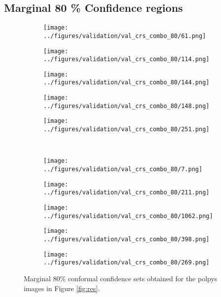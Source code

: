 \subsection{Marginal 80 \% Confidence regions}
\begin{figure}[h!]
	\begin{subfigure}{0.19\textwidth}
		\centering
		\texttt{[image: ../figures/validation/val\_crs\_combo\_80/61.png]}
		\label{fig:1}
	\end{subfigure}
	\begin{subfigure}{0.19\textwidth}
		\centering
		\texttt{[image: ../figures/validation/val\_crs\_combo\_80/114.png]}
		\label{fig:1}
	\end{subfigure}
	\begin{subfigure}{0.19\textwidth}
		\centering
		\texttt{[image: ../figures/validation/val\_crs\_combo\_80/144.png]}
		\label{fig:1}
	\end{subfigure}
	\begin{subfigure}{0.19\textwidth}
		\centering
		\texttt{[image: ../figures/validation/val\_crs\_combo\_80/148.png]}
		\label{fig:1}
	\end{subfigure}
	\begin{subfigure}{0.19\textwidth}
		\centering
		\texttt{[image: ../figures/validation/val\_crs\_combo\_80/251.png]}
		\label{fig:1}
	\end{subfigure}
	\vspace{-0.35cm}
	\\
	\begin{subfigure}{0.19\textwidth}
		\centering
		\texttt{[image: ../figures/validation/val\_crs\_combo\_80/7.png]}
		\label{fig:1}
	\end{subfigure}
	\begin{subfigure}{0.19\textwidth}
		\centering
		\texttt{[image: ../figures/validation/val\_crs\_combo\_80/211.png]}
		\label{fig:1}
	\end{subfigure}
	\begin{subfigure}{0.19\textwidth}
		\centering
		\texttt{[image: ../figures/validation/val\_crs\_combo\_80/1062.png]}
		\label{fig:1}
	\end{subfigure}
	\begin{subfigure}{0.19\textwidth}
		\centering
		\texttt{[image: ../figures/validation/val\_crs\_combo\_80/398.png]}
		\label{fig:1}
	\end{subfigure}
	\begin{subfigure}{0.19\textwidth}
		\centering
		\texttt{[image: ../figures/validation/val\_crs\_combo\_80/269.png]}
		\label{fig:1}
	\end{subfigure}
	\label{fig:grid}
	\caption{Marginal 80\% conformal confidence sets obtained for the polpys images in Figure \ref{fig:res}.}\label{fig:joint2}
\end{figure}
